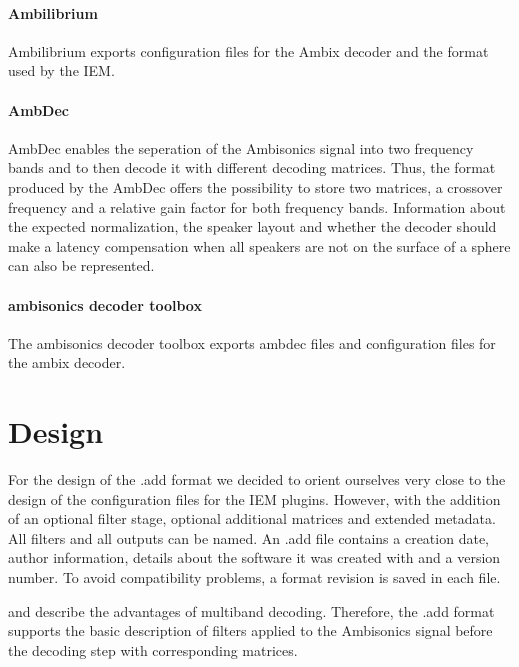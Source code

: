 \documentclass[a4paper, 10pt, twocolumn]{article}
\begin{document}
\paragraph{Ambilibrium}

Ambilibrium \cite{romanov2018ambilibrium} exports configuration files for the Ambix decoder and the format used by the IEM.

\paragraph{AmbDec}

AmbDec enables the seperation of the Ambisonics signal into two frequency bands and to then decode it with different decoding matrices. Thus, the format produced by the AmbDec offers the possibility to store two matrices, a crossover frequency and a relative gain factor for both frequency bands. Information about the expected normalization, the speaker layout and whether the decoder should make a latency compensation when all speakers are not on the surface of a sphere can also be represented.\cite{AmbDecManual}

\paragraph{ambisonics decoder toolbox}

The ambisonics decoder toolbox exports ambdec files and configuration files for the ambix decoder. \cite{adtpaper} 


\section{Design} \label{sec:Design}

For the design of the .add format we decided to orient ourselves very close to the design of the configuration files for the IEM plugins. However, with the addition of an optional filter stage, optional additional matrices and extended metadata. All filters and all outputs can be named. An .add file contains a creation date, author information, details about the software it was created with and a version number. To avoid compatibility problems, a format revision is saved in each file. 

\cite{heller2008is} and \cite{ambifilters} describe the advantages of multiband decoding. Therefore, the .add format supports the basic description of filters applied to the Ambisonics signal before the decoding step with corresponding matrices.
\end{document}
